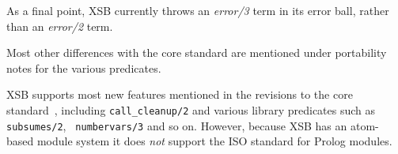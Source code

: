 As a final point, XSB currently throws an {\em error/3} term in its
error ball, rather than an {\em error/2} term. 


Most other differences with the core standard are mentioned under
portability notes for the various predicates.  


XSB supports most new features mentioned in the revisions to the core
standard~\cite{ISO-Revision}, including {\tt call\_cleanup/2} and
various library predicates such as {\tt subsumes/2}, {\tt
  numbervars/3} and so on.
However, because XSB has an atom-based module system it does {\em not}
support the ISO standard for Prolog modules.

